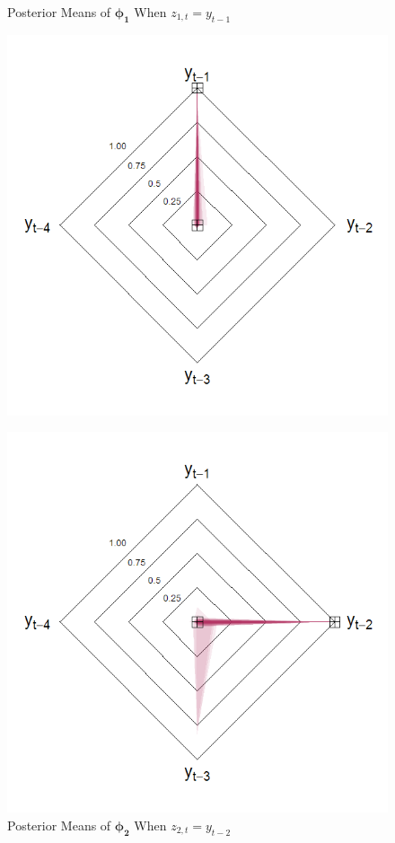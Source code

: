 \begin{figure}[!h]
\center
\begin{minipage}[h]{0.3\textwidth}
\caption{Posterior Means of $\bm{\phi_1}$ When $z_{1,t}=y_{t-1}$}
\label{fig:th1}
\includegraphics[scale=0.29]{hsthvar1}
\end{minipage} \hspace{0.09\textwidth}
\begin{minipage}[h]{0.3\textwidth}
\caption{Posterior Means of $\bm{\phi_2}$ When $z_{2,t}=y_{t-2}$}
\label{fig:th2}
\includegraphics[scale=0.29]{hsthvar2}

\end{minipage}
\end{figure}
